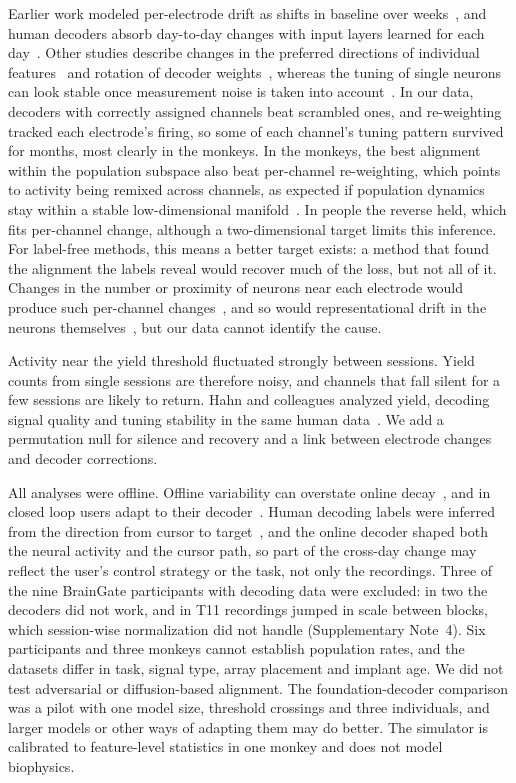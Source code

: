 \documentclass{iopjournal}
\begin{document}
Earlier work modeled per-electrode drift as shifts in baseline over weeks~\cite{bishop2014,jarosiewicz2015}, and human
decoders absorb day-to-day changes with input layers learned for each day~\cite{willett2021,fan2023}. Other studies
describe changes in the preferred directions of individual features~\cite{pun2024} and rotation of decoder
weights~\cite{wilson2025}, whereas the tuning of single neurons can look stable once measurement noise is taken into
account~\cite{stevenson2011}. In our data, decoders with correctly assigned channels beat scrambled ones, and re-weighting
tracked each electrode's firing, so some of each channel's tuning pattern survived for months, most clearly in the
monkeys. In the monkeys, the best alignment within the population subspace also beat per-channel re-weighting, which
points to activity being remixed across channels, as expected if population dynamics stay within a stable
low-dimensional manifold~\cite{gallego2018,gallego2020,safaie2023}. In people the reverse held, which fits per-channel change, although
a two-dimensional target limits this inference. For label-free methods, this means a better target exists: a method
that found the alignment the labels reveal would recover much of the loss, but not all of it. Changes in the number or
proximity of neurons near each electrode would produce such per-channel changes~\cite{polikov2005,kozai2015}, and so
would representational drift in the neurons themselves~\cite{driscoll2022,natraj2025}, but our data cannot identify the
cause.

Activity near the yield threshold fluctuated strongly between sessions. Yield counts from single sessions are therefore
noisy, and channels that fall silent for a few sessions are likely to return. Hahn and colleagues analyzed yield,
decoding signal quality and tuning stability in the same human data~\cite{hahn2026}. We add a permutation null for
silence and recovery and a link between electrode changes and decoder corrections.

All analyses were offline. Offline variability can overstate online decay~\cite{flint2013}, and in closed loop users
adapt to their decoder~\cite{gilja2012}. Human decoding labels were inferred from the direction from cursor to target~\cite{jarosiewicz2013},
and the online decoder shaped both the neural activity and the cursor path, so part of the cross-day change may reflect
the user's control strategy or the task, not only the recordings. Three of the nine BrainGate participants with
decoding data were excluded: in two the decoders did not work, and in T11 recordings jumped in scale between blocks,
which session-wise normalization did not handle (Supplementary Note~4). Six participants and three monkeys cannot
establish population rates, and the datasets differ in task, signal type, array placement and implant age. We did not
test adversarial or diffusion-based alignment. The foundation-decoder comparison was a pilot with one model size, threshold crossings and
three individuals, and larger models or other ways of adapting them may do better. The simulator is calibrated to
feature-level statistics in one monkey and does not model biophysics.
\end{document}
